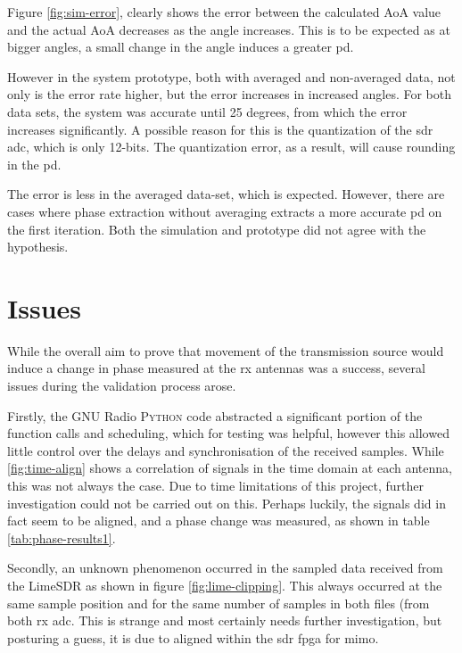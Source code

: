 \documentclass[class=report,11pt,crop=false]{standalone}
\begin{document}
Figure \ref{fig:sim-error}, clearly shows the error between the calculated \gls{AoA} value and the actual \gls{AoA} decreases as the angle increases. This is to be expected as at bigger angles, a small change in the angle induces a greater \gls{pd}. 

However in the system prototype, both with averaged and non-averaged data, not only is the error rate higher, but the error increases in increased angles. For both data sets, the system was accurate until 25 degrees, from which the error increases significantly. A possible reason for this is the quantization of the \gls{sdr} \gls{adc}, which is only 12-bits. The quantization error, as a result, will cause rounding in the \gls{pd}.

The error is less in the averaged data-set, which is expected. However, there are cases where phase extraction without averaging extracts a more accurate \gls{pd} on the first iteration. 
Both the simulation and prototype did not agree with the hypothesis.

\section{Issues}

While the overall aim to prove that movement of the transmission source would induce a change in phase measured at the \gls{rx} antennas was a success, several issues during the validation process arose. 

Firstly, the GNU Radio \textsc{Python} code abstracted a significant portion of the function calls and scheduling, which for testing was helpful, however this allowed little control over the delays and synchronisation of the received samples. While \ref{fig:time-align} shows a correlation of signals in the time domain at each antenna, this was not always the case. Due to time limitations of this project, further investigation could not be carried out on this. Perhaps luckily, the signals did in fact seem to be aligned, and a phase change was measured, as shown in table \ref{tab:phase-results1}.

Secondly, an unknown phenomenon occurred in the sampled data received from the LimeSDR as shown in figure \ref{fig:lime-clipping}. This always occurred at the same sample position and for the same number of samples in both files (from both \gls{rx} \gls{adc}. This is strange and most certainly needs further investigation, but posturing a guess, it is due to aligned within the \gls{sdr} \gls{fpga} for \gls{mimo}.
\end{document}
